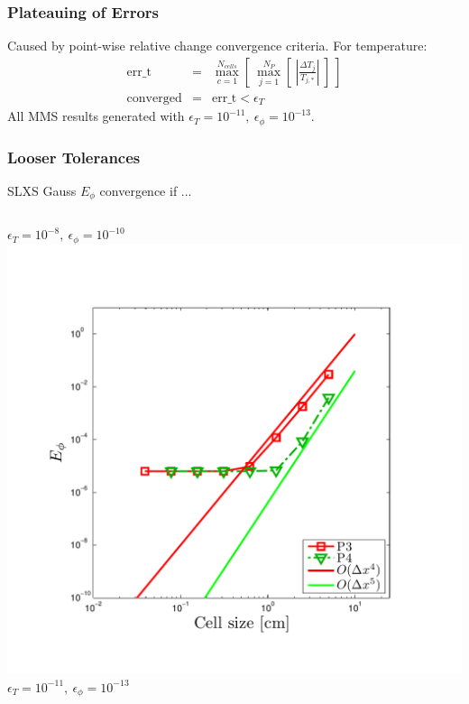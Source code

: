 \documentclass{beamer}
\newcommand{\bea}{\begin{eqnarray*}}  %
\newcommand{\eea}{\end{eqnarray*}}
\newcommand{\abs}[1]{\ensuremath{\left\lvert #1 \right\rvert}}  %
\begin{document}
\begin{frame}
\frametitle{Plateauing of Errors}
Caused by point-wise relative change convergence criteria.  For temperature:
\bea
\text{err\_t} &=& \max_{c=1}^{N_{cells}} \left[ ~\max_{j=1}^{N_P} \left[  ~\abs{ \frac{ \Delta T_j }{ T_{j,*} } } ~\right] ~\right] \\
\text{converged} &=& \text{err\_t} < \epsilon_T
\eea
All MMS results generated with $\epsilon_T = 10^{-11},~\epsilon_{\phi}=10^{-13}$. 
\end{frame}

\begin{frame}
\frametitle{Looser Tolerances}
SLXS Gauss $E_{\phi}$ convergence if ...
\vspace{0.1in}
\begin{columns}[t]
\centering
$\epsilon_T = 10^{-8},~\epsilon_{\phi}=10^{-10}$
\includegraphics[width=\textwidth,trim=0.25in  0.2in 0.75in 0.5in,clip=true]{../chapter6_grey_radtran/Dissertation_Data/MMS3_Low_Tol_First_SLXS_Gauss_phi_L2.pdf}
\centering
$\epsilon_T = 10^{-11},~\epsilon_{\phi}=10^{-13}$

\end{columns}
\end{frame}
\end{document}

